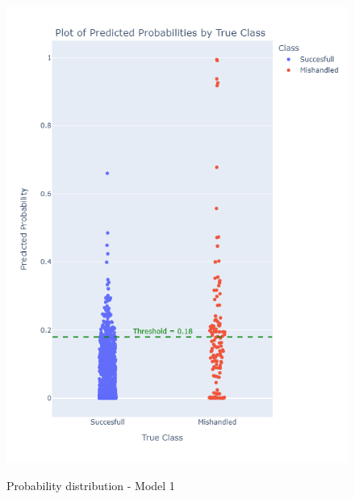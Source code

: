 \documentclass[12pt]{article}
\begin{document}
\begin{figure}
\begin{minipage}[c]{0.4\linewidth}
    \includegraphics[width=1\textwidth]{Probability_distribution_Model 1.png}\\
    \caption{Probability distribution - Model 1}
    \label{fig:Probability_distribution_Model 1}
\end{minipage}%
\hfill
\begin{minipage}[c]{0.4\linewidth}

\end{minipage}
\end{figure}
\end{document}
